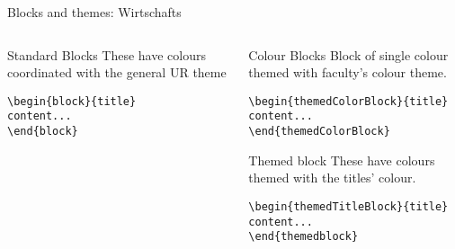 \begingroup
{}
\begin{frame}[fragile]{Blocks and themes: Wirtschafts}
\begin{columns} %
\begin{column}{0.3\textwidth}
\begin{block}{Standard Blocks}
These have colours coordinated with the general UR theme
\begin{verbatim}
\begin{block}{title}
content...
\end{block}
\end{verbatim}
\end{block}
\end{column}
\begin{column}{0.7\textwidth}
\begin{themedColorBlock}{Colour Blocks}
Block of single colour themed with faculty's colour theme.
\small
\begin{verbatim}
\begin{themedColorBlock}{title}
content...
\end{themedColorBlock}
\end{verbatim}
\end{themedColorBlock}
\begin{themedTitleBlock} {Themed block}
These have colours themed with the titles' colour.
\small
\begin{verbatim}
\begin{themedTitleBlock}{title}
content...
\end{themedblock}
\end{verbatim}
\end{themedTitleBlock}
\end{column}
\end{columns}
\end{frame}
\endgroup


